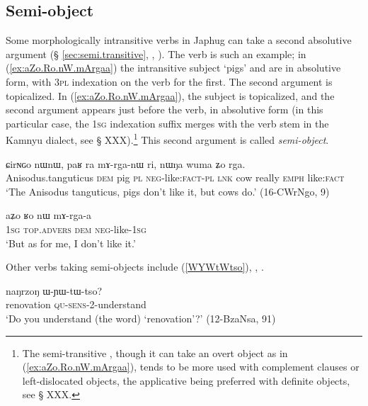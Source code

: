 \subsection{Semi-object} \label{sec:semi.object}
Some morphologically intransitive verbs in Japhug can take a second absolutive argument (§ \ref{sec:semi.transitive}, \citealt[4-5]{jacques16relatives},  \citealt[224]{jacques16complementation}). The verb  is such an example; in (\ref{ex:aZo.Ro.nW.mArgaa}) the intransitive subject  `pigs' and  are in absolutive form, with  \textsc{3pl} indexation on the verb for the first. The second argument   is topicalized. In (\ref{ex:aZo.Ro.nW.mArgaa}), the subject is topicalized, and the second argument   appears just before the verb, in absolutive form (in this particular case, the \textsc{1sg} indexation suffix merges with the verb stem in the Kamnyu dialect, see § XXX).\footnote{The semi-transitive , though it can take an overt object as in  (\ref{ex:aZo.Ro.nW.mArgaa}), tends to be more used with complement clauses or left-dislocated objects, the applicative  being preferred with definite objects, see § XXX.} This second argument is called \textit{semi-object}.

\begin{exe}
\ex \label{ex:paR.ra.mArganW}
\gll ɕirɴɢo nɯnɯ, paʁ ra mɤ-rga-nɯ ri, nɯŋa wuma ʑo rga.\\
Anisodus.tanguticus \textsc{dem} pig \textsc{pl} \textsc{neg}-like:\textsc{fact}-\textsc{pl} \textsc{lnk} cow really \textsc{emph} like:\textsc{fact} \\
\glt `The Anisodus tanguticus, pigs don't like it, but cows do.' (16-CWrNgo, 9)
\end{exe}

\begin{exe}
\ex \label{ex:aZo.Ro.nW.mArgaa}
\gll aʑo ʁo nɯ mɤ-rga-a \\
\textsc{1sg}  \textsc{top}.\textsc{advers} \textsc{dem} \textsc{neg}-like-\textsc{1sg} \\
\glt `But as for me, I don't like it.' 
\end{exe}

Other verbs taking semi-objects include  (\ref{WYWtWtso}), , .

\begin{exe}
\ex \label{WYWtWtso}
 \gll naŋrzoŋ ɯ-ɲɯ-tɯ-tso? \\
renovation \textsc{qu}-\textsc{sens}-2-understand \\
\glt `Do you understand (the word) `renovation'?' (12-BzaNsa, 91)
\end{exe}

